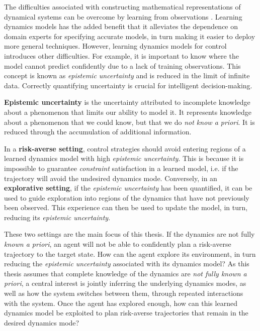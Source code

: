 \documentclass{mimosis-class/mimosis}
\numberwithin{equation}{chapter}
\begin{document}
The difficulties associated with constructing mathematical representations of dynamical systems
can be overcome by learning from observations \citep{ljungSystem1999}.
Learning dynamics models has the added benefit that it
alleviates the dependence on domain experts for specifying accurate models, in turn making it easier to
deploy more general techniques.
However, learning dynamics models for control introduces other difficulties.
For example, it is important to know
where the model cannot predict confidently due to a lack of training observations.
This concept is known as \emph{epistemic uncertainty} and is reduced in the limit of infinite data.
Correctly quantifying uncertainty is crucial for intelligent decision-making.
\begin{myquote}
\textbf{Epistemic uncertainty}
is the uncertainty attributed to incomplete knowledge about a phenomenon that limits our ability to model it.
It represents knowledge about a phenomenon that we could know, but that we do \textit{not know a priori}.
It is reduced through the accumulation of additional information.
\end{myquote}

In a \textbf{risk-averse setting}, control strategies should avoid entering regions of
a learned dynamics model with high \emph{epistemic uncertainty}.
This is because it is impossible to guarantee \emph{constraint} satisfaction in a learned model, i.e.
if the trajectory will avoid the undesired dynamics mode.
Conversely, in an \textbf{explorative setting},
if the \emph{epistemic uncertainty} has been quantified, it can be used to guide exploration into
regions of the dynamics that have not previously been observed.
This experience can then be used to update the model, in turn, reducing its \emph{epistemic uncertainty}.

These two settings are the main focus of this thesis.
If the dynamics are not fully \emph{known a priori}, an agent will not be able to confidently plan a
risk-averse trajectory to the target state.
How can the agent explore its environment, in turn reducing the \emph{epistemic uncertainty}
associated with its dynamics model?
As this thesis assumes that complete knowledge of the dynamics are \emph{not fully known a priori},
a central interest is jointly inferring the underlying dynamics modes, as well as how the system switches
between them, through repeated interactions with the system.
Once the agent has explored enough, how can this learned dynamics model be exploited to plan risk-averse trajectories
that remain in the desired dynamics mode?
\end{document}
